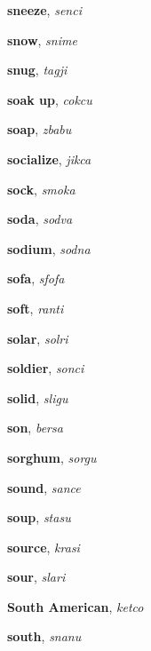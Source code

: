 \documentclass[12pt]{book}
\begin{document}
\begin{description}
\item[ ] \textbf{sneeze}, \textit{senci}

\item[ ] \textbf{snow}, \textit{snime}

\item[ ] \textbf{snug}, \textit{tagji}

\item[ ] \textbf{soak up}, \textit{cokcu}

\item[ ] \textbf{soap}, \textit{zbabu}

\item[ ] \textbf{socialize}, \textit{jikca}

\item[ ] \textbf{sock}, \textit{smoka}

\item[ ] \textbf{soda}, \textit{sodva}

\item[ ] \textbf{sodium}, \textit{sodna}

\item[ ] \textbf{sofa}, \textit{sfofa}

\item[ ] \textbf{soft}, \textit{ranti}

\item[ ] \textbf{solar}, \textit{solri}

\item[ ] \textbf{soldier}, \textit{sonci}

\item[ ] \textbf{solid}, \textit{sligu}

\item[ ] \textbf{son}, \textit{bersa}

\item[ ] \textbf{sorghum}, \textit{sorgu}

\item[ ] \textbf{sound}, \textit{sance}

\item[ ] \textbf{soup}, \textit{stasu}

\item[ ] \textbf{source}, \textit{krasi}

\item[ ] \textbf{sour}, \textit{slari}

\item[ ] \textbf{South American}, \textit{ketco}

\item[ ] \textbf{south}, \textit{snanu}


\end{description}
\end{document}
